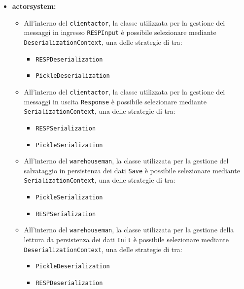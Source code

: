 \documentclass{scalatekids-article}
\begin{document}
\begin{itemize}
\begin{itemize}
  \item \textbf{actorsystem:}
    \begin{itemize}
    \item All'interno del  \verb=clientactor=, la classe utilizzata per la
      gestione dei messaggi in ingresso \verb=RESPInput= è possibile selezionare
      mediante \verb=DeserializationContext=, una delle strategie di 
      tra:
      \begin{itemize}
      \item \verb=RESPDeserialization=
      \item \verb=PickleDeserialization=
      \end{itemize}
    \item All'interno del  \verb=clientactor=, la classe utilizzata per la
      gestione dei messaggi in uscita \verb=Response= è possibile selezionare
      mediante \verb=SerializationContext=, una delle strategie di 
      tra:
      \begin{itemize}
      \item \verb=RESPSerialization=
      \item \verb=PickleSerialization=
      \end{itemize}
    \item All'interno del  \verb=warehouseman=, la classe utilizzata per
      la gestione del salvataggio in persistenza dei dati \verb=Save= è
      possibile selezionare mediante \verb=SerializationContext=, una delle
      strategie di  tra:
      \begin{itemize}
      \item \verb=PickleSerialization=
      \item \verb=RESPSerialization=
      \end{itemize}
    \item All'interno del  \verb=warehouseman=, la classe utilizzata per
      la gestione della lettura da persistenza dei dati \verb=Init= è
      possibile selezionare mediante \verb=DeserializationContext=, una delle
      strategie di  tra:
      \begin{itemize}
      \item \verb=PickleDeserialization=
      \item \verb=RESPDeserialization=
      \end{itemize}
    \end{itemize}

  \end{itemize}

\end{itemize}
\end{document}
